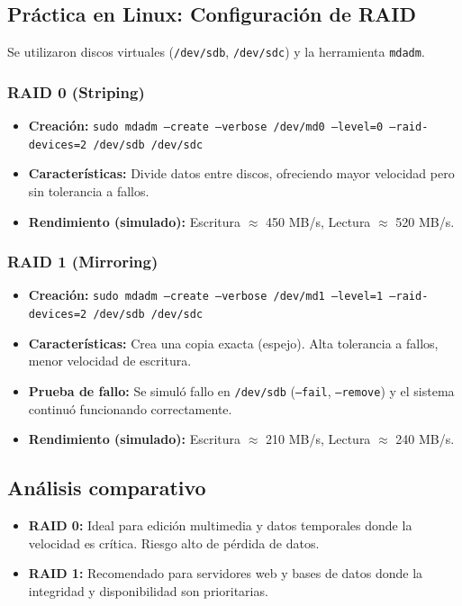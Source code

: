 \documentclass[stu, 12pt, letterpaper, donotrepeattitle, floatsintext, noapacite]{apa7}
\begin{document}
\subsection{Práctica en Linux: Configuración de RAID}
Se utilizaron discos virtuales (\texttt{/dev/sdb}, \texttt{/dev/sdc}) y la herramienta \texttt{mdadm}.

\subsubsection{RAID 0 (Striping)}
\begin{itemize}
    \item \textbf{Creación:} \texttt{sudo mdadm --create --verbose /dev/md0 --level=0 --raid-devices=2 /dev/sdb /dev/sdc}
    \item \textbf{Características:} Divide datos entre discos, ofreciendo mayor velocidad pero sin tolerancia a fallos.
    \item \textbf{Rendimiento (simulado):} Escritura $\approx$ 450 MB/s, Lectura $\approx$ 520 MB/s.
\end{itemize}

\subsubsection{RAID 1 (Mirroring)}
\begin{itemize}
    \item \textbf{Creación:} \texttt{sudo mdadm --create --verbose /dev/md1 --level=1 --raid-devices=2 /dev/sdb /dev/sdc}
    \item \textbf{Características:} Crea una copia exacta (espejo). Alta tolerancia a fallos, menor velocidad de escritura.
    \item \textbf{Prueba de fallo:} Se simuló fallo en \texttt{/dev/sdb} (\texttt{--fail}, \texttt{--remove}) y el sistema continuó funcionando correctamente.
    \item \textbf{Rendimiento (simulado):} Escritura $\approx$ 210 MB/s, Lectura $\approx$ 240 MB/s.
\end{itemize}

\subsection{Análisis comparativo}
\begin{itemize}
    \item \textbf{RAID 0:} Ideal para edición multimedia y datos temporales donde la velocidad es crítica. Riesgo alto de pérdida de datos.
    \item \textbf{RAID 1:} Recomendado para servidores web y bases de datos donde la integridad y disponibilidad son prioritarias.
\end{itemize}
\end{document}
